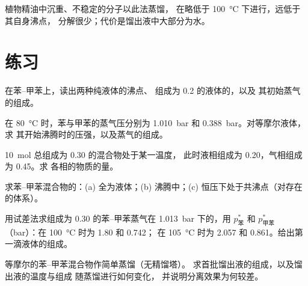 植物精油中沉重、不稳定的分子以此法蒸馏，
在略低于 \qty{100}{\degreeCelsius} 下进行，远低于其自身沸点，
分解很少；代价是馏出液中大部分为水。

\section{练习}

\begin{exercise}[$\star$]\label{exo:b2:liquid-vapour-diagrams:1}
在苯–甲苯上，读出两种纯液体的沸点、
组成为 0.2 的液体的，以及
其初始蒸气的组成。
\end{exercise}

\begin{exercise}[$\star$]\label{exo:b2:liquid-vapour-diagrams:2}
在 \qty{80}{\degreeCelsius} 时，苯与甲苯的蒸气压分别为
\qty{1.010}{bar} 和 \qty{0.388}{bar}。对等摩尔液体，求
其开始沸腾时的压强，以及蒸气的组成。
\end{exercise}

\begin{exercise}[$\star$]\label{exo:b2:liquid-vapour-diagrams:3}
\qty{10}{mol} 总组成为 0.30 的混合物处于某一温度，
此时液相组成为 0.20，气相组成为 0.45。求
各相的物质的量。
\end{exercise}

\begin{exercise}[$\star$]\label{exo:b2:liquid-vapour-diagrams:4}
求苯–甲苯混合物的：(a) 全为液体；(b)
沸腾中；(c) 恒压下处于共沸点（对存在的体系）。
\end{exercise}

\begin{exercise}[$\star\star$]\label{exo:b2:liquid-vapour-diagrams:5}
用试差法求组成为 0.30 的苯–甲苯蒸气在
\qty{1.013}{bar} 下的，用 $p^*_{\text{苯}}$ 和 $p^*_{\text{甲苯}}$
（\unit{bar}）：在 \qty{100}{\degreeCelsius} 时为 1.80 和 0.742；
在 \qty{105}{\degreeCelsius} 时为 2.057 和 0.861。给出第一滴液体的组成。
\end{exercise}

\begin{exercise}[$\star\star$]\label{exo:b2:liquid-vapour-diagrams:6}
等摩尔的苯–甲苯混合物作简单蒸馏（无精馏塔）。
求首批馏出液的组成，以及馏出液的温度与组成
随蒸馏进行如何变化，
并说明分离效果为何较差。
\end{exercise}

